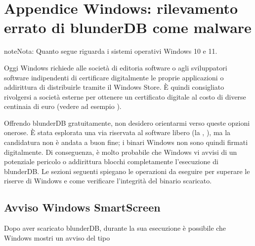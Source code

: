 \documentclass[letterpaper,10pt,italian]{sphinxmanual}
\begin{document}
\section{Appendice Windows: rilevamento errato di blunderDB come malware}
\label{\detokenize{annexe_windows_securite:annexe-windows-detection-abusive-de-blunderdb-comme-logiciel-malveillant}}\label{\detokenize{annexe_windows_securite:annexe-windows-malware}}\label{\detokenize{annexe_windows_securite::doc}}
\begin{sphinxadmonition}{note}{Nota:}
\sphinxAtStartPar
Quanto segue riguarda i sistemi operativi Windows 10 e 11.
\end{sphinxadmonition}

\sphinxAtStartPar
Oggi Windows richiede alle società di editoria software o agli sviluppatori software indipendenti di certificare digitalmente le proprie applicazioni o addirittura di distribuirle tramite il Windows Store. È quindi consigliato rivolgersi a società esterne per ottenere un certificato digitale al costo di diverse centinaia di euro (vedere ad esempio  ).

\sphinxAtStartPar
Offrendo blunderDB gratuitamente, non desidero orientarmi verso queste opzioni onerose. È stata esplorata una via  riservata al software libero (la , ), ma la candidatura non è andata a buon fine; i binari Windows non sono quindi firmati digitalmente. Di conseguenza, è molto probabile che Windows vi avvisi di un potenziale pericolo o addirittura blocchi completamente l’esecuzione di blunderDB. Le sezioni seguenti spiegano le operazioni da eseguire per superare le riserve di Windows e come verificare l’integrità del binario scaricato.


\subsection{Avviso Windows SmartScreen}
\label{\detokenize{annexe_windows_securite:avertissement-windows-smartscreen}}
\sphinxAtStartPar
Dopo aver scaricato blunderDB, durante la sua esecuzione è possibile che Windows mostri un avviso del tipo

\begin{figure}[htbp]
\centering

\noindent{}
\end{figure}
\end{document}

